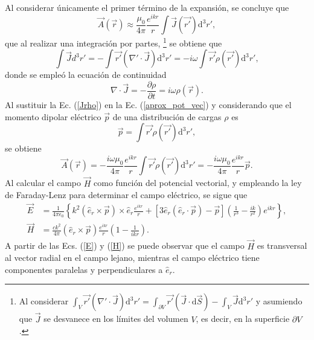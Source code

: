 Al considerar únicamente el primer término de la expansión, se concluye que 
\begin{equation}
    \Vec{A}(\Vec{r})\approx\frac{\mu_0}{4\pi}\frac{e^{ikr}}{r}\int \Vec{J}(\Vec{r'}) \text{d}^3r',    
    \label{aprox_pot_vec}
\end{equation}
que al realizar una integración por partes,  \footnote{Al considerar $\int_V \Vec{r'}(\nabla'\cdot\Vec{J})\text{d}^3r'=\int_{\partial V} \Vec{r'}(\Vec{J}\cdot \text{d}\Vec{S})-\int_V \Vec{J}\text{d}^3r'$ y asumiendo que $\Vec{J}$ se desvanece en los límites del volumen $V$, es decir, en la superficie $\partial V$. } se obtiene que
\begin{equation}
	\int\Vec{J}d^3r'=-\int \Vec{r'}(\nabla'\cdot\Vec{J})\text{d}^3r'=-i\omega\int \Vec{r'}\rho(\Vec{r'})\text{d}^3r',
	\label{Jrho}
\end{equation}
donde se empleó la ecuación de continuidad
\begin{equation*}
    \nabla\cdot\Vec{J}=-\frac{\partial\rho}{\partial t}=i\omega\rho(\Vec{r}). 
\end{equation*}
Al sustituir la Ec. (\ref{Jrho}) en la Ec. (\ref{aprox_pot_vec}) y considerando que el momento dipolar eléctrico $\Vec{p}$ de una distribución de cargas $\rho$ es
\begin{equation*}
	\Vec{p}=\int \Vec{r'}\rho(\Vec{r'})\text{d}^3r',
\end{equation*}
se obtiene 
\begin{equation}
    \Vec{A}(\Vec{r})=-\frac{i\omega\mu_0}{4\pi}\frac{e^{ikr}}{r}\int \Vec{r'}\rho(\Vec{r'})\text{d}^3r'=-\frac{i\omega\mu_0}{4\pi}\frac{e^{ikr}}{r}\Vec{p}. 
    \label{A_dip}  
\end{equation}
Al calcular el campo $\Vec{H}$ como función del potencial vectorial, y empleando la ley de Faraday-Lenz para determinar el campo eléctrico, se sigue que \cite{Jackson}
\begin{align}
	\Vec{E}&=\frac{1}{4\pi\epsilon_0}\left\{k^2(\hat{e}_r\times\Vec{p})\times\hat{e}_r\frac{e^{ikr}}{r}+[3\hat{e}_r(\hat{e}_r\cdot\Vec{p})-\Vec{p}]\left(\frac{1}{r^3}-\frac{ik}{r^2}\right)e^{ikr}\right\},\label{E}\\
    \Vec{H}&=\frac{ck^2}{4\pi}(\hat{e}_r\times\Vec{p})\frac{e^{ikr}}{r}\left(1-\frac{1}{ikr}\right).    \label{H}
\end{align}
A partir de las Ecs. (\ref{E})  y (\ref{H}) se puede observar que el campo $\Vec{H}$ es transversal al vector radial en el campo lejano, mientras el campo eléctrico tiene componentes paralelas y perpendiculares a $\hat{e}_r$.\\ 

